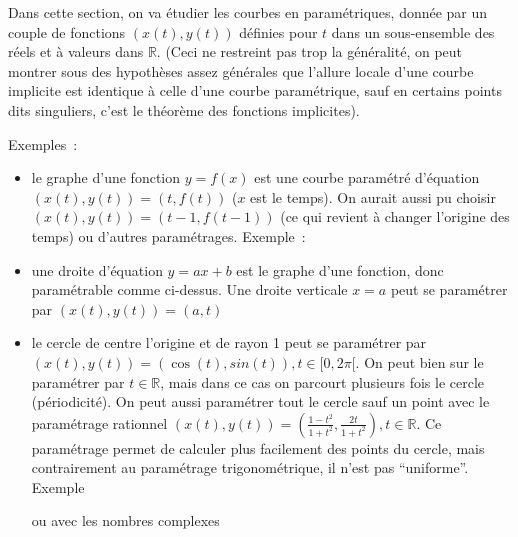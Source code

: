 \documentclass[a4paper,11pt]{article}
\begin{document}
\begin{giacjshere}
Dans cette section, on va \'etudier les courbes en param\'etriques,
donn\'ee par un couple de fonctions $(x(t),y(t))$ d\'efinies 
pour $t$ dans un sous-ensemble des r\'eels et \`a valeurs dans $\mathbb{R}$.
(Ceci ne restreint pas trop la g\'en\'eralit\'e,
on peut montrer sous des hypoth\`eses assez g\'en\'erales 
que l'allure locale d'une courbe implicite est identique \`a celle
d'une courbe param\'etrique, sauf en certains points dits singuliers,
c'est le th\'eor\`eme des fonctions implicites).

Exemples~:
\begin{itemize}
\item le graphe d'une fonction $y=f(x)$ est une courbe param\'etr\'e
d'\'equation $(x(t),y(t))=(t,f(t))$ ($x$ est le temps). 
On aurait aussi pu choisir
$(x(t),y(t))=(t-1,f(t-1))$ (ce qui revient \`a changer l'origine des
temps) ou d'autres param\'etrages.
Exemple~: \\
\item une droite d'\'equation $y=ax+b$ est le graphe d'une fonction,
donc param\'etrable comme ci-dessus. Une droite verticale $x=a$ peut
se param\'etrer par $(x(t),y(t))=(a,t)$
\item le cercle de centre l'origine et de rayon 1 peut se param\'etrer
  par $(x(t),y(t))=(\cos(t),sin(t)), t \in [0,2\pi[$. On peut bien sur
le param\'etrer par $t \in \mathbb{R}$, mais dans ce cas on parcourt plusieurs
fois le cercle (p\'eriodicit\'e). On peut aussi param\'etrer tout le
cercle sauf un point avec le param\'etrage rationnel
$(x(t),y(t))=(\frac{1-t^2}{1+t^2},\frac{2t}{1+t^2}), t \in \mathbb{R}$. Ce
param\'etrage permet de calculer plus facilement des points
du cercle, mais contrairement au param\'etrage trigonom\'etrique,
il n'est pas ``uniforme''.\\
Exemple 

ou avec les nombres complexes\\
\end{itemize}


\end{giacjshere}
\end{document}
